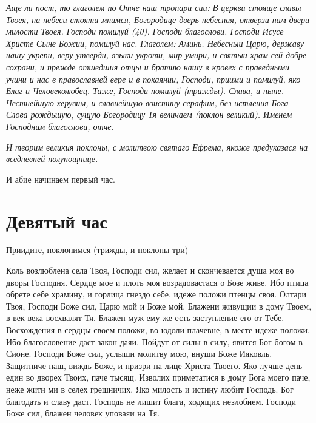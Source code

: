 \itshape Аще ли пост, то глаголем по Отче наш тропари сии:\normalfont{} В церкви стояще славы Твоея, на небеси стояти мнимся, Богородице дверь небесная, отверзи нам двери милости Твоея. Господи помилуй (40). Господи благослови. Господи Исусе Христе Сыне Божии, помилуй нас. Глаголем: Аминь. Небесныи Царю, державу нашу укрепи, веру утверди, языки укроти, мир умири, и святыи храм сей добре сохрани, и прежде отшедшия отцы и братию нашу в кровех с праведными учини и нас в православней вере и в покаянии, Господи, приими и помилуй, яко Благ и Человеколюбец. Таже, Господи помилуй (трижды). Слава, и ныне. Честнейшую херувим, и славнейшую воистину серафим, без истления Бога Слова рождьшую, сущую Богородицу Тя величаем (поклон великий). Именем Господним благослови, отче.


\itshape И творим великия поклоны, с молитвою святаго Ефрема, якоже предуказася на вседневней полунощнице. 

И абие начинаем первый час.\normalfont{}


\section{Девятый час}
 


Приидите, поклонимся (трижды, и поклоны три)




Коль возлюблена села Твоя, Господи сил, желает и скончевается душа моя во дворы Господня. Сердце мое и плоть моя возрадовастася о Бозе живе. Ибо птица обрете себе храмину, и горлица гнездо себе, идеже положи птенцы своя. Олтари Твоя, Господи Боже сил, Царю мой и Боже мой. Блажени живущии в дому Твоем, в век века восхвалят Тя. Блажен муж ему же есть заступление его от Тебе. Восхождения в сердцы своем положи, во юдоли плачевне, в месте идеже положи. Ибо благословение даст закон даяи. Пойдут от силы в силу, явится Бог богом в Сионе. Господи Боже сил, услыши молитву мою, внуши Боже Ияковль. Защитниче наш, виждь Боже, и призри на лице Христа Твоего. Яко лучше день един во дворех Твоих, паче тысящ. Изволих приметатися в дому Бога моего паче, неже жити ми в селех грешничих. Яко милость и истину любит Господь. Бог благодать и славу даст. Господь не лишит блага, ходящих незлобием. Господи Боже сил, блажен человек уповаяи на Тя.




